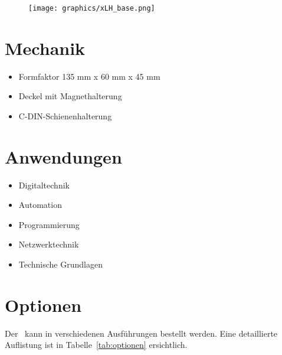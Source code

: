 \vfill\break

\begin{figure}[h]
    \centering
    \texttt{[image: graphics/xLH\_base.png]}
\end{figure}

\section{Mechanik}

\begin{itemize}
    \item Formfaktor 135 mm x 60 mm x 45 mm
    \item Deckel mit Magnethalterung
    \item C-DIN-Schienenhalterung
\end{itemize}

\section{Anwendungen}

\begin{itemize}
    \item Digitaltechnik
    \item Automation
    \item Programmierung
    \item Netzwerktechnik
    \item Technische Grundlagen
\end{itemize}

\vfill\break


\onecolumn

\section{Optionen}
Der \lernplattformname\ kann in verschiedenen Ausführungen bestellt werden.
Eine detaillierte Auflistung ist in Tabelle~\ref{tab:optionen} ersichtlich.

